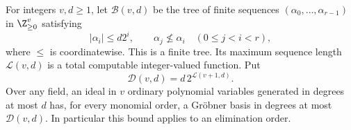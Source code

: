 \begin{lemma}
\label{c:recursive-elimination-bound}
For integers $v,d\geq1$, let $\mathcal B(v,d)$ be the tree of
finite sequences $(\alpha_0,\ldots,\alpha_{r-1})$ in $\Z_{\geq0}^v$
satisfying
\[
 |\alpha_i|\leq d2^i,
 \qquad \alpha_j\not\leq\alpha_i\quad(0\leq j<i<r),
\]
where $\leq$ is coordinatewise.  This is a finite tree.  Its
maximum sequence length $\mathcal L(v,d)$ is a total computable
integer-valued function.  Put
\[
 \mathcal D(v,d)=d\,2^{\mathcal L(v+1,d)}.
\]
Over any field, an ideal in $v$ ordinary polynomial variables
generated in degrees at most $d$ has, for every monomial order,
a Gr\"obner basis in degrees at most $\mathcal D(v,d)$.
In particular this bound applies to an elimination order.
\end{lemma}

